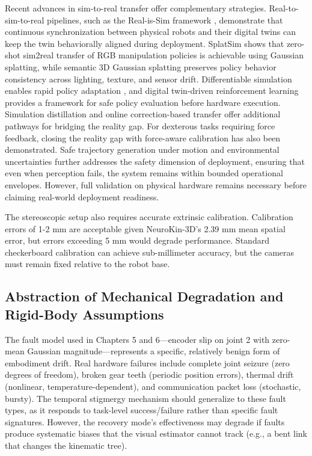 \documentclass[12pt,a4paper,oneside]{report}
\begin{document}
Recent advances in sim-to-real transfer offer complementary strategies. Real-to-sim-to-real pipelines, such as the Real-is-Sim framework \cite{torne2024rialto}, demonstrate that continuous synchronization between physical robots and their digital twins can keep the twin behaviorally aligned during deployment. SplatSim \cite{qureshi2025splatsim} shows that zero-shot sim2real transfer of RGB manipulation policies is achievable using Gaussian splatting, while semantic 3D Gaussian splatting \cite{tang2025semantic} preserves policy behavior consistency across lighting, texture, and sensor drift. Differentiable simulation enables rapid policy adaptation \cite{pan2025learningfly}, and digital twin-driven reinforcement learning \cite{xu2025twinrl} provides a framework for safe policy evaluation before hardware execution. Simulation distillation \cite{levy2024simdist} and online correction-based transfer \cite{jiang2024transic} offer additional pathways for bridging the reality gap. For dexterous tasks requiring force feedback, closing the reality gap with force-aware calibration \cite{bytedance2025closing} has also been demonstrated. Safe trajectory generation under motion and environmental uncertainties \cite{meng2026riskbounded} further addresses the safety dimension of deployment, ensuring that even when perception fails, the system remains within bounded operational envelopes. However, full validation on physical hardware remains necessary before claiming real-world deployment readiness.

The stereoscopic setup also requires accurate extrinsic calibration. Calibration errors of 1-2 mm are acceptable given NeuroKin-3D's 2.39 mm mean spatial error, but errors exceeding 5 mm would degrade performance. Standard checkerboard calibration can achieve sub-millimeter accuracy, but the cameras must remain fixed relative to the robot base.

\subsection{Abstraction of Mechanical Degradation and Rigid-Body Assumptions}

The fault model used in Chapters 5 and 6—encoder slip on joint 2 with zero-mean Gaussian magnitude—represents a specific, relatively benign form of embodiment drift. Real hardware failures include complete joint seizure (zero degrees of freedom), broken gear teeth (periodic position errors), thermal drift (nonlinear, temperature-dependent), and communication packet loss (stochastic, bursty). The temporal stigmergy mechanism should generalize to these fault types, as it responds to task-level success/failure rather than specific fault signatures. However, the recovery mode's effectiveness may degrade if faults produce systematic biases that the visual estimator cannot track (e.g., a bent link that changes the kinematic tree).
\end{document}
